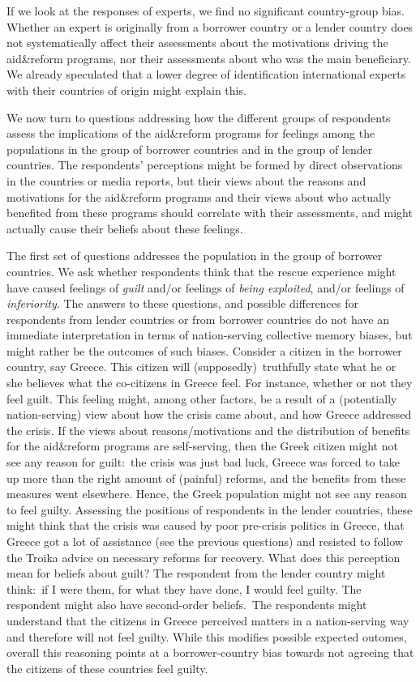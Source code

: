 If we look at the responses of experts, we find no significant country-group
bias. Whether an expert is originally from a borrower country or a lender
country does not systematically affect their assessments about the
motivations driving the aid\&reform programs, nor their assessments about
who was the main beneficiary. We already speculated that a lower degree of
identification international experts with their countries of origin might
explain this.

We now turn to questions addressing how the different groups of respondents
assess the implications of the aid\&reform programs for feelings among the
populations in the group of borrower countries and in the group of lender
countries. The respondents' perceptions might be formed by direct
observations in the countries or media reports, but their views about the
reasons and motivations for the aid\&reform programs and their views about
who actually benefited from these programs should correlate with their
assessments, and might actually cause their beliefs about these feelings. 

The first set of questions addresses the population in the group of borrower
countries. We ask whether respondents think that the rescue experience might
have caused feelings of \textit{guilt} and/or feelings of \textit{being
exploited}, and/or feelings of \textit{inferiority}. The answers to these
questions, and possible differences for respondents from lender countries or
from borrower countries do not have an immediate interpretation in terms of
nation-serving collective memory biases, but might rather be the outcomes of
such biases. Consider a citizen in the borrower country, say Greece. This
citizen will (supposedly)\ truthfully state what he or she believes what the
co-citizens in Greece feel. For instance, whether or not they feel guilt.
This feeling might, among other factors, be a result of a (potentially
nation-serving) view about how the crisis came about, and how Greece
addressed the crisis. If the views about reasons/motivations and the
distribution of benefits for the aid\&reform programs are self-serving, then
the Greek citizen might not see any reason for guilt:\ the crisis was just
bad luck, Greece was forced to take up more than the right amount of
(painful) reforms, and the benefits from these measures went elsewhere.
Hence, the Greek population might not see any reason to feel guilty.
Assessing the positions of respondents in the lender countries, these might
think that the crisis was caused by poor pre-crisis politics in Greece, that
Greece got a lot of assistance (see the previous questions) and resisted to
follow the Troika advice on necessary reforms for recovery. What does this
perception mean for beliefs about guilt? The respondent from the lender
country might think:\ if I were them, for what they have done, I would feel
guilty. The respondent might also have second-order beliefs.\ The respondents
might understand that the citizens in Greece perceived matters in a
nation-serving way and therefore will not feel guilty. While this modifies
possible expected outomes, overall this reasoning points at a
borrower-country bias towards not agreeing that the citizens of these
countries feel guilty. 

